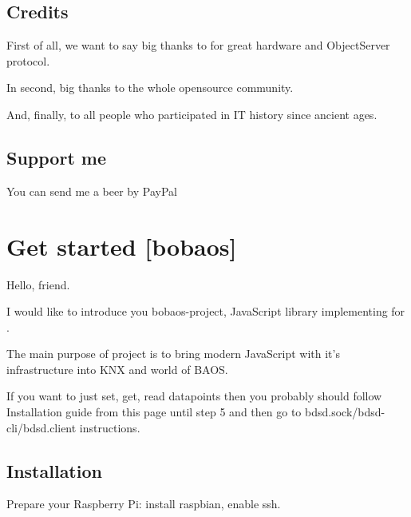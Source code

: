\documentclass[letterpaper,10pt,english]{sphinxmanual}
\begin{document}
\section{Credits}
\label{\detokenize{intro:credits}}\label{\detokenize{intro:credits}}
First of all, we want to say big thanks to  for great hardware and ObjectServer protocol.

In second, big thanks to the whole opensource community.

And, finally, to all people who participated in IT history since ancient ages.


\section{Support me}
\label{\detokenize{intro:support-me}}\label{\detokenize{intro:support-me}}
You can send me a beer by PayPal



\chapter{Get started {[}bobaos{]}}
\label{\detokenize{bobaos:get-started-bobaos}}\label{\detokenize{bobaos:get-started-bobaos}}\label{\detokenize{bobaos::doc}}
Hello, friend.

I would like to introduce you bobaos-project, JavaScript library implementing  for .

The main purpose of project is to bring modern JavaScript with it’s infrastructure into KNX and world of BAOS.

If you want to just set, get, read datapoints then you probably should follow Installation guide from this page until step 5 and then go to bdsd.sock/bdsd-cli/bdsd.client instructions.


\section{Installation}
\label{\detokenize{bobaos:installation}}\label{\detokenize{bobaos:installation}}
\sphinxstylestrong{1{]}} Prepare your Raspberry Pi: install raspbian, enable ssh.
\end{document}
